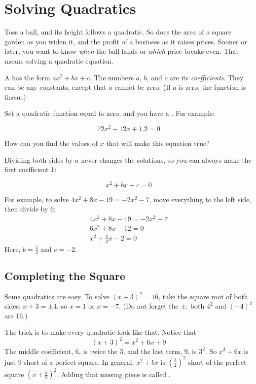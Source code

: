 \chapter{Solving Quadratics}

Toss a ball, and its height follows a quadratic. So does the area of a
square garden as you widen it, and the profit of a business as it raises
prices. Sooner or later, you want to know \emph{when} the ball lands or
\emph{which} price breaks even. That means solving a quadratic equation.

A  has the form $ax^2 + bx + c$. The numbers
$a$, $b$, and $c$ are its \textit{coefficients}. They can be any
constants, except that $a$ cannot be zero. (If $a$ is zero, the function is
linear.)

Set a quadratic function equal to zero, and you have a . For example:

$$72x^2 - 12x + 1.2 = 0$$

How can you find the values of $x$ that will make this equation true?

Dividing both sides by $a$ never changes the solutions, so you can always
make the first coefficient 1:

$$x^2 +bx + c = 0$$

For example, to solve $4x^2 + 8x - 19 = -2x^2 - 7$, move everything to
the left side, then divide by 6:
\begin{multline*}
  4x^2 + 8x - 19 = -2x^2 - 7 \\
  6x^2 + 8x -12 = 0 \\
  x^2 + \frac{4}{3}x - 2 = 0
\end{multline*}
Here, $b = \frac{4}{3}$ and $c = -2$.

\section{Completing the Square}
Some quadratics are easy. To solve $(x + 3)^2 = 16$, take the square root
of both sides: $x + 3 = \pm 4$, so $x = 1$ or $x = -7$. (Do not forget the
$\pm$: both $4^2$ and $(-4)^2$ are 16.)

The trick is to make every quadratic look like that. Notice that
$$(x + 3)^2 = x^2 + 6x + 9$$
The middle coefficient, 6, is twice the 3, and the last term, 9, is
$3^2$. So $x^2 + 6x$ is just 9 short of a perfect square. In general,
$x^2 + bx$ is $\left(\frac{b}{2}\right)^2$ short of the perfect square
$\left(x + \frac{b}{2}\right)^2$. Adding that missing piece is called
.

